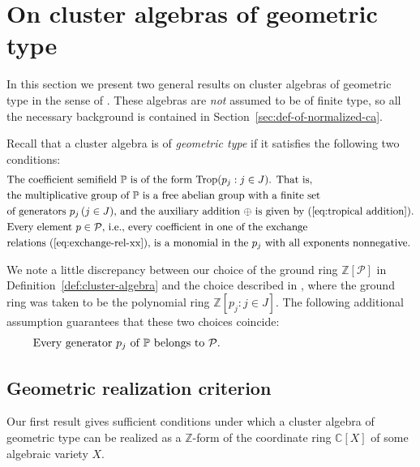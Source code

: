 \documentclass[letterpaper]{amsart}
\numberwithin{equation}{section}
\theoremstyle{definition}
\def\ZZ{\mathbb{Z}}
\def\CC{\mathbb{C}}
\def\PP{\mathbb{P}}
\def\Trop{{\rm Trop}}
\begin{document}
\pagebreak[3] 
 
\section{On cluster algebras of geometric type} 
\label{sec:geometric-type-ca} 
In this section we present two general results 
on %
cluster algebras of geometric type in the sense of 
\cite[Definition~5.7]{fz-clust1}. 
These algebras are \emph{not} assumed to be of finite type, so all 
the %
necessary background 
is contained in 
Section~\ref{sec:def-of-normalized-ca}. 
 
Recall that a cluster algebra is of \emph{geometric type} if it 
satisfies the following two conditions: 
\begin{align} 
\label{eq:geometric-1} 
&\text{The coefficient semifield $\PP$ is of the form $\Trop (p_j: j 
  \in  J)$. 
That is,} \\ 
\nonumber 
&\text{the multiplicative group of $\PP$ is a free abelian group 
with a finite set} \\ 
\nonumber 
&\text{of generators $p_j \, (j \in J)$, and the 
auxiliary addition $\oplus$ is given by 
(\ref{eq:tropical addition}).} 
\\ 
&\label{eq:geometric-2} 
\text{Every element $p \in \mathcal{P}$, i.e., every coefficient in one 
of the exchange}\\ 
\nonumber 
&\text{relations (\ref{eq:exchange-rel-xx}), is a 
monomial in the $p_j$ with all exponents nonnegative.} 
\end{align} 
 
We note a little discrepancy between our choice of the ground ring 
$\ZZ[\mathcal{P}]$ in Definition~\ref{def:cluster-algebra} 
and the choice described in \cite[Section~5]{fz-clust1}, where the 
ground ring was taken to be the polynomial ring $\ZZ[p_j: j \in J]$. 
The following additional assumption 
guarantees that these two choices coincide: 
\begin{equation} 
\label{eq:geometric-3} 
\text{Every generator $p_j$ of $\PP$ belongs to $\mathcal{P}$.} \hspace{2.05in} 
\end{equation} 
 
\subsection{Geometric realization criterion} 
Our first result gives sufficient 
conditions under which a cluster algebra of geometric type 
can be realized as  a $\ZZ$-form of the coordinate ring $\CC[X]$ 
of some algebraic variety $X$. 
 
\end{document}
